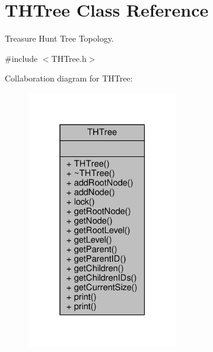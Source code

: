 \hypertarget{classTHTree}{}\section{T\+H\+Tree Class Reference}
\label{classTHTree}


Treasure Hunt Tree Topology.  




{\ttfamily \#include $<$T\+H\+Tree.\+h$>$}



Collaboration diagram for T\+H\+Tree\+:\nopagebreak
\begin{figure}[H]
\begin{center}
\leavevmode
\includegraphics[width=187pt]{classTHTree__coll__graph}
\end{center}
\end{figure}
